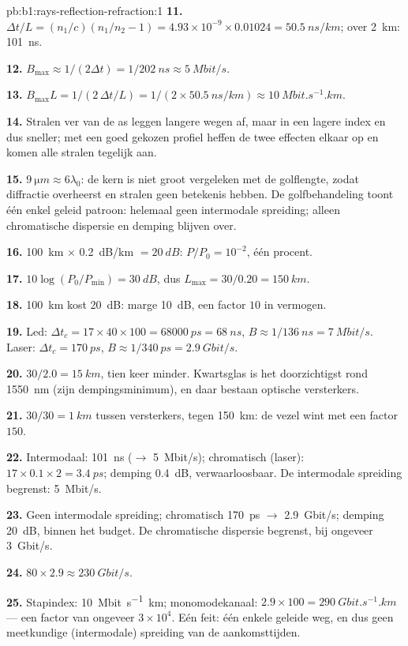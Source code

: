\begin{solution}{pb:b1:rays-reflection-refraction:1}
\textbf{11.} $\Delta t/L = (n_1/c)(n_1/n_2 - 1) = 4.93\times10^{-9} \times
0.01024 = \qty{50.5}{ns/km}$; over \qty{2}{km}: \qty{101}{ns}.

\textbf{12.} $B_{\max} \approx 1/(2\Delta t) = 1/\qty{202}{ns} \approx
\qty{5}{Mbit/s}$.

\textbf{13.} $B_{\max} L = 1/(2\,\Delta t/L) = 1/(2 \times
\qty{50.5}{ns/km}) \approx \qty{10}{Mbit.s^{-1}.km}$.

\textbf{14.} Stralen ver van de as leggen langere wegen af, maar in een
lagere index en dus sneller; met een goed gekozen profiel heffen de twee
effecten elkaar op en komen alle stralen tegelijk aan.

\textbf{15.} $\qty{9}{\micro m} \approx 6\lambda_0$: de kern is niet groot
vergeleken met de golflengte, zodat diffractie overheerst en stralen geen
betekenis hebben. De golfbehandeling toont één enkel geleid patroon: helemaal
geen intermodale spreiding; alleen chromatische dispersie en demping
blijven over.

\textbf{16.} \qty{100}{km} $\times$ \qty{0.2}{dB/km} $= \qty{20}{dB}$:
$P/P_0 = 10^{-2}$, één procent.

\textbf{17.} $10\log(P_0/P_{\min}) = \qty{30}{dB}$, dus $L_{\max} =
30/0.20 = \qty{150}{km}$.

\textbf{18.} \qty{100}{km} kost \qty{20}{dB}: marge \qty{10}{dB}, een
factor $10$ in vermogen.

\textbf{19.} Led: $\Delta t_c = 17 \times 40 \times 100 = \qty{68000}{ps}
= \qty{68}{ns}$, $B \approx 1/\qty{136}{ns} = \qty{7}{Mbit/s}$. Laser:
$\Delta t_c = \qty{170}{ps}$, $B \approx 1/\qty{340}{ps} =
\qty{2.9}{Gbit/s}$.

\textbf{20.} $30/2.0 = \qty{15}{km}$, tien keer minder. Kwartsglas is het
doorzichtigst rond \qty{1550}{nm} (zijn dempingsminimum), en daar bestaan
optische versterkers.

\textbf{21.} $30/30 = \qty{1}{km}$ tussen versterkers, tegen
\qty{150}{km}: de vezel wint met een factor $150$.

\textbf{22.} Intermodaal: \qty{101}{ns} ($\to$ \qty{5}{Mbit/s});
chromatisch (laser): $17 \times 0.1 \times 2 = \qty{3.4}{ps}$;
demping \qty{0.4}{dB}, verwaarloosbaar. De intermodale spreiding begrenst:
\qty{5}{Mbit/s}.

\textbf{23.} Geen intermodale spreiding; chromatisch \qty{170}{ps} $\to$
\qty{2.9}{Gbit/s}; demping \qty{20}{dB}, binnen het budget. De chromatische
dispersie begrenst, bij ongeveer \qty{3}{Gbit/s}.

\textbf{24.} $80 \times 2.9 \approx \qty{230}{Gbit/s}$.

\textbf{25.} Stapindex: \qty{10}{Mbit.s^{-1}.km}; monomodekanaal:
$2.9 \times 100 = \qty{290}{Gbit.s^{-1}.km}$ --- een factor van ongeveer
$3\times10^4$. Eén feit: één enkele geleide weg, en dus geen meetkundige
(intermodale) spreiding van de aankomsttijden.
\end{solution}
